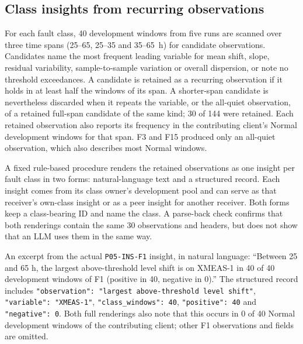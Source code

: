 \documentclass[conference]{IEEEtran}
\begin{document}
\subsection{Class insights from recurring observations}
For each fault class, 40 development windows from five runs are scanned over three time spans (25--65, 25--35 and 35--65~h) for candidate observations. Candidates name the most frequent leading variable for mean shift, slope, residual variability, sample-to-sample variation or overall dispersion, or note no threshold exceedances. A candidate is retained as a recurring observation if it holds in at least half the windows of its span. A shorter-span candidate is nevertheless discarded when it repeats the variable, or the all-quiet observation, of a retained full-span candidate of the same kind; 30 of 144 were retained. Each retained observation also reports its frequency in the contributing client's Normal development windows for that span. F3 and F15 produced only an all-quiet observation, which also describes most Normal windows.

A fixed rule-based procedure renders the retained observations as one insight per fault class in two forms: natural-language text and a structured record. Each insight comes from its class owner's development pool and can serve as that receiver's own-class insight or as a peer insight for another receiver. Both forms keep a class-bearing ID and name the class. A parse-back check confirms that both renderings contain the same 30 observations and headers, but does not show that an LLM uses them in the same way.

An excerpt from the actual \texttt{P05-INS-F1} insight, in natural language: ``Between 25 and 65 h, the largest above-threshold level shift is on XMEAS-1 in 40 of 40 development windows of F1 (positive in 40, negative in 0).'' The structured record includes \texttt{"observation": "largest above-threshold level shift"}, \texttt{"variable": "XMEAS-1"}, \texttt{"class\_windows": 40}, \texttt{"positive": 40} and \texttt{"negative": 0}. Both full renderings also note that this occurs in 0 of 40 Normal development windows of the contributing client; other F1 observations and fields are omitted.
\end{document}
